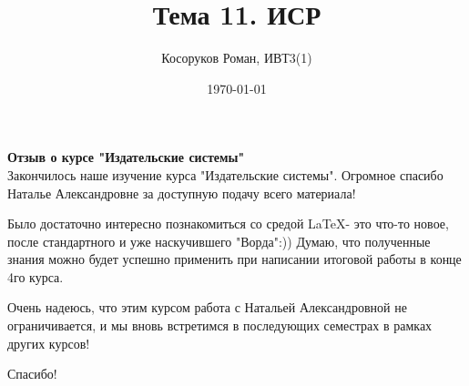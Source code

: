 \documentclass[a4paper,12pt]{article}
\title{Тема 11. ИСР}
\author{Косоруков Роман, ИВТ3(1)}
\date{\today}
\begin{document}
\maketitle
\newpage
\Large
\textbf{Отзыв о курсе "Издательские системы"}\\[0.1cm]

\normalsize
Закончилось наше изучение курса "Издательские системы". Огромное спасибо Наталье Александровне за доступную подачу всего материала! 

Было достаточно интересно познакомиться со средой \LaTeX - это что-то новое, после стандартного и уже наскучившего "Ворда":)) Думаю, что полученные знания можно будет успешно применить при написании итоговой работы в конце 4го курса.

Очень надеюсь, что этим курсом работа с Натальей Александровной не ограничивается, и мы вновь встретимся в последующих семестрах в рамках других курсов!

Спасибо!
\end{document}
